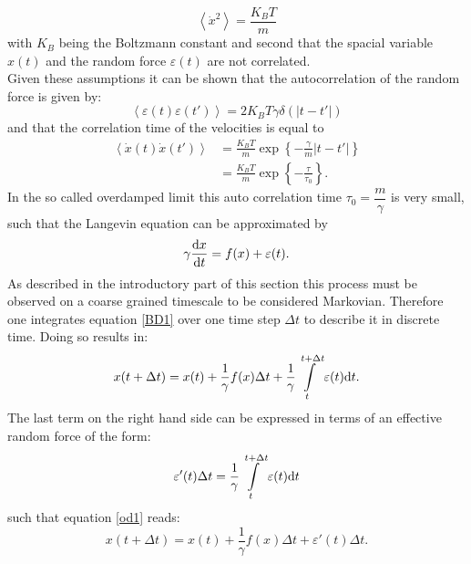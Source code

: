 \begin{equation}
    \left< \dot{x}^{2} \right> = \frac{K_B T}{m}
    \label{2nd_moment_of_velocities}
\end{equation}
with $K_B$ being the Boltzmann constant and second that the spacial variable $x(t)$ and the random force $\varepsilon (t)$ are not correlated. \\
Given these assumptions it can be shown that the autocorrelation of the random force is given by:
\begin{equation}
    \left< \varepsilon(t) \varepsilon(t') \right> = 2 K_B T \gamma \delta(|t-t'|)
    \label{ff_autocorrelation}
\end{equation}
and that the correlation time of the velocities is equal to
\begin{align}
    \left< \dot{x}(t) \dot{x}(t') \right> &= \frac{K_B T}{m} \exp \left\{-\frac{\gamma}{m}|t-t'|\right\} \nonumber \\
    &=\frac{K_B T}{m} \exp\left\{-\frac{\tau}{\tau_0} \right\} .
    \label{vv_autocorrelation}
\end{align}
In the so called overdamped limit this auto correlation time $ \tau_0 = \dfrac{m}{\gamma}$ is very small, such that the Langevin equation can be approximated by
\begin{equation}
    \gamma \frac{ {\rm d}x}{{\rm d}t} = f(x) + \varepsilon(t).
    \label{BD1}
\end{equation}
As described in the introductory part of this section this process must be observed on a coarse grained timescale to be considered Markovian. Therefore one integrates equation \eqref{BD1} over one time step $\Delta t$ to describe it in discrete time. Doing so results in:
\begin{equation}
x(t + \Delta t) = x(t) + \frac{1}{\gamma} f(x) \Delta t + \frac{1}{\gamma} \int\limits_{t}^{t+\Delta t} \varepsilon(t) {\rm d} t.
    \label{od1}
\end{equation}
The last term on the right hand side can be expressed in terms of an effective random force of the form:
\begin{equation}
    \varepsilon'(t) \Delta t = \frac{1}{\gamma}\int\limits_{t}^{t + \Delta t} \varepsilon(t) {\rm d} t
    \label{eff_rdf}
\end{equation}
such that equation \eqref{od1} reads:
\begin{equation}
    x(t + \Delta t) = x(t) + \frac{1}{\gamma} f(x) \Delta t + \varepsilon'(t) \Delta t.
    \label{od2}
\end{equation}
